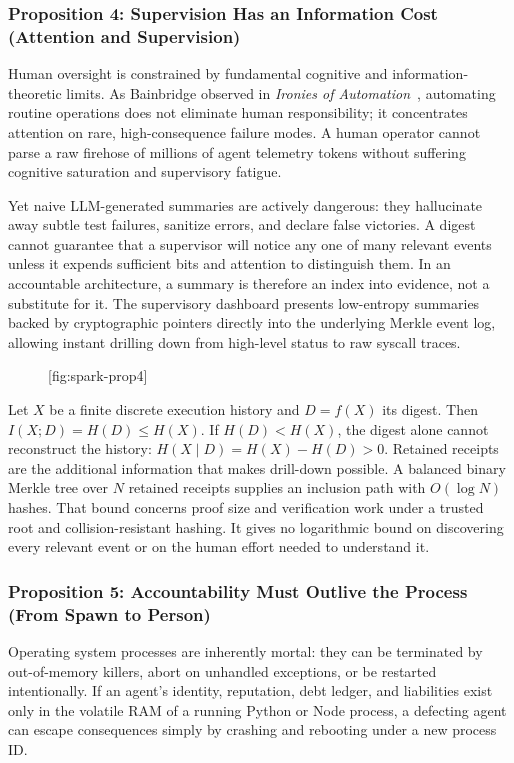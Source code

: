 \documentclass[11pt,a4paper]{article}
\providecommand{\pdchapref}[2]{\textbf{#2}}
\begin{document}
\subsubsection*{Proposition 4: Supervision Has an Information Cost (\pdchapref{ls}{Attention and Supervision})}
Human oversight is constrained by fundamental cognitive and information-theoretic limits. As Bainbridge observed in \emph{Ironies of Automation}~, automating routine operations does not eliminate human responsibility; it concentrates attention on rare, high-consequence failure modes. A human operator cannot parse a raw firehose of millions of agent telemetry tokens without suffering cognitive saturation and supervisory fatigue.

Yet naive LLM-generated summaries are actively dangerous: they hallucinate away subtle test failures, sanitize errors, and declare false victories. A digest cannot guarantee that a supervisor will notice any one of many relevant events unless it expends sufficient bits and attention to distinguish them. In an accountable architecture, a summary is therefore an index into evidence, not a substitute for it. The supervisory dashboard presents low-entropy summaries backed by cryptographic pointers directly into the underlying Merkle event log, allowing instant drilling down from high-level status to raw syscall traces.

\begin{figure}[tp]
  \centering
  [fig:spark-prop4]
\end{figure}

Let $X$ be a finite discrete execution history and $D=f(X)$ its digest. Then $I(X;D)=H(D)\le H(X)$. If $H(D)<H(X)$, the digest alone cannot reconstruct the history: $H(X\mid D)=H(X)-H(D)>0$. Retained receipts are the additional information that makes drill-down possible. A balanced binary Merkle tree over $N$ retained receipts supplies an inclusion path with $O(\log N)$ hashes. That bound concerns proof size and verification work under a trusted root and collision-resistant hashing. It gives no logarithmic bound on discovering every relevant event or on the human effort needed to understand it.

\subsubsection*{Proposition 5: Accountability Must Outlive the Process (\pdchapref{stp}{From Spawn to Person})}
Operating system processes are inherently mortal: they can be terminated by out-of-memory killers, abort on unhandled exceptions, or be restarted intentionally. If an agent's identity, reputation, debt ledger, and liabilities exist only in the volatile RAM of a running Python or Node process, a defecting agent can escape consequences simply by crashing and rebooting under a new process ID.
\end{document}
